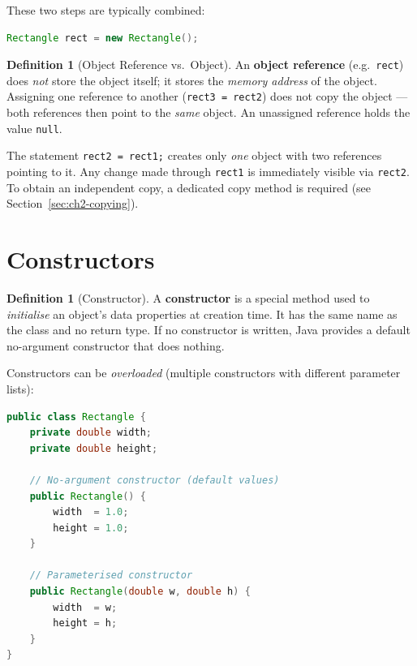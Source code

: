 \documentclass[11pt, a4paper, notitlepage]{report}
\theoremstyle{definition}
\newtheorem{definition}[theorem]{Definition}
\theoremstyle{remark}
\theoremstyle{definition}
\begin{document}
These two steps are typically combined:
\begin{lstlisting}[language=Java]
Rectangle rect = new Rectangle();
\end{lstlisting}

\begin{definition}[Object Reference vs.\ Object]
\label{def:ch2-object-reference}
An \textbf{object reference} (e.g.\ \texttt{rect}) does \emph{not} store the object itself; it stores the \emph{memory address} of the object. Assigning one reference to another (\texttt{rect3 = rect2}) does not copy the object --- both references then point to the \emph{same} object. An unassigned reference holds the value \texttt{null}.
\end{definition}

\begin{warning}[title={Warning: Reference Assignment is Not Object Copying}]
The statement \texttt{rect2 = rect1;} creates only \emph{one} object with two references pointing to it. Any change made through \texttt{rect1} is immediately visible via \texttt{rect2}. To obtain an independent copy, a dedicated copy method is required (see Section~\ref{sec:ch2-copying}).
\end{warning}

\section{Constructors}
\label{sec:ch2-constructors}

\begin{definition}[Constructor]
\label{def:ch2-constructor}
A \textbf{constructor} is a special method used to \emph{initialise} an object's data properties at creation time. It has the same name as the class and no return type. If no constructor is written, Java provides a default no-argument constructor that does nothing.
\end{definition}

Constructors can be \emph{overloaded} (multiple constructors with different parameter lists):

\begin{lstlisting}[language=Java, caption={Rectangle with two constructors}]
public class Rectangle {
    private double width;
    private double height;

    // No-argument constructor (default values)
    public Rectangle() {
        width  = 1.0;
        height = 1.0;
    }

    // Parameterised constructor
    public Rectangle(double w, double h) {
        width  = w;
        height = h;
    }
}
\end{lstlisting}
\end{document}
